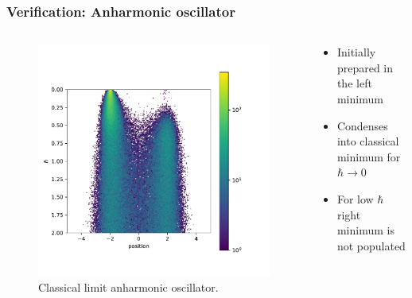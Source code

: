 \documentclass[aspectratio=169]{beamer}
\begin{document}
\begin{frame}
	\frametitle{Verification: Anharmonic oscillator}
	\vspace{-15px}
	\begin{columns}
		\begin{column}{0.49\textwidth}
			\begin{figure}[H]
				\centering\includegraphics[width=\textwidth]{../imgs/anharmonic_oscillator_classical_limit/anharmonic_oscillator_classical_limit.pdf}
			\caption{Classical limit anharmonic oscillator.}
			\label{fig:anharmonic_oscillator_classical_limit}
			\end{figure}
		\end{column}
		\begin{column}{0.49\textwidth}
			\begin{itemize}
				\item Initially prepared in the left minimum
				\item Condenses into classical minimum for $\hbar \rightarrow 0$
				\item For low $\hbar$ right minimum is not populated
			\end{itemize}
		\end{column}
	\end{columns}
\end{frame}
\end{document}
